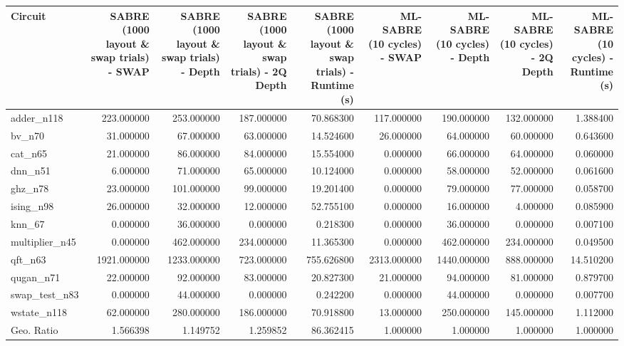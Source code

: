 \begin{tabular}{lrrrrrrrr}
\toprule
Circuit & SABRE (1000 layout \& swap trials) - SWAP & SABRE (1000 layout \& swap trials) - Depth & SABRE (1000 layout \& swap trials) - 2Q Depth & SABRE (1000 layout \& swap trials) - Runtime (s) & ML-SABRE (10 cycles) - SWAP & ML-SABRE (10 cycles) - Depth & ML-SABRE (10 cycles) - 2Q Depth & ML-SABRE (10 cycles) - Runtime (s) \\
\midrule
adder\_n118 & 223.000000 & 253.000000 & 187.000000 & 70.868300 & 117.000000 & 190.000000 & 132.000000 & 1.388400 \\
bv\_n70 & 31.000000 & 67.000000 & 63.000000 & 14.524600 & 26.000000 & 64.000000 & 60.000000 & 0.643600 \\
cat\_n65 & 21.000000 & 86.000000 & 84.000000 & 15.554000 & 0.000000 & 66.000000 & 64.000000 & 0.060000 \\
dnn\_n51 & 6.000000 & 71.000000 & 65.000000 & 10.124000 & 0.000000 & 58.000000 & 52.000000 & 0.061600 \\
ghz\_n78 & 23.000000 & 101.000000 & 99.000000 & 19.201400 & 0.000000 & 79.000000 & 77.000000 & 0.058700 \\
ising\_n98 & 26.000000 & 32.000000 & 12.000000 & 52.755100 & 0.000000 & 16.000000 & 4.000000 & 0.085900 \\
knn\_67 & 0.000000 & 36.000000 & 0.000000 & 0.218300 & 0.000000 & 36.000000 & 0.000000 & 0.007100 \\
multiplier\_n45 & 0.000000 & 462.000000 & 234.000000 & 11.365300 & 0.000000 & 462.000000 & 234.000000 & 0.049500 \\
qft\_n63 & 1921.000000 & 1233.000000 & 723.000000 & 755.626800 & 2313.000000 & 1440.000000 & 888.000000 & 14.510200 \\
qugan\_n71 & 22.000000 & 92.000000 & 83.000000 & 20.827300 & 21.000000 & 94.000000 & 81.000000 & 0.879700 \\
swap\_test\_n83 & 0.000000 & 44.000000 & 0.000000 & 0.242200 & 0.000000 & 44.000000 & 0.000000 & 0.007700 \\
wstate\_n118 & 62.000000 & 280.000000 & 186.000000 & 70.918800 & 13.000000 & 250.000000 & 145.000000 & 1.112000 \\
Geo. Ratio & 1.566398 & 1.149752 & 1.259852 & 86.362415 & 1.000000 & 1.000000 & 1.000000 & 1.000000 \\
\bottomrule
\end{tabular}

